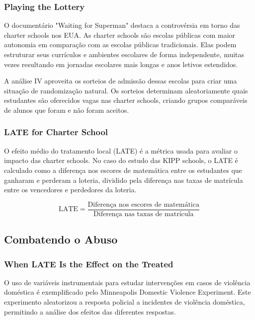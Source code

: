 \documentclass[a4paper,12pt]{article}[abntex2]
\begin{document}
\subsubsection*{Playing the Lottery}

O documentário "Waiting for Superman" destaca a controvérsia em torno das charter schools nos EUA. As charter schools são escolas públicas com maior autonomia em comparação com as escolas públicas tradicionais. Elas podem estruturar seus currículos e ambientes escolares de forma independente, muitas vezes resultando em jornadas escolares mais longas e anos letivos estendidos.

A análise IV aproveita os sorteios de admissão dessas escolas para criar uma situação de randomização natural. Os sorteios determinam aleatoriamente quais estudantes são oferecidos vagas nas charter schools, criando grupos comparáveis de alunos que foram e não foram aceitos.

\subsubsection*{LATE for Charter School}

O efeito médio do tratamento local (LATE) é a métrica usada para avaliar o impacto das charter schools. No caso do estudo das KIPP schools, o LATE é calculado como a diferença nos escores de matemática entre os estudantes que ganharam e perderam a loteria, dividido pela diferença nas taxas de matrícula entre os vencedores e perdedores da loteria.

\begin{equation}
    \text{LATE} = \frac{\text{Diferença nos escores de matemática}}{\text{Diferença nas taxas de matrícula}}
\end{equation}

\subsection{Combatendo o Abuso}

\subsubsection*{When LATE Is the Effect on the Treated}

O uso de variáveis instrumentais para estudar intervenções em casos de violência doméstica é exemplificado pelo Minneapolis Domestic Violence Experiment. Este experimento aleatorizou a resposta policial a incidentes de violência doméstica, permitindo a análise dos efeitos das diferentes respostas.
\end{document}
